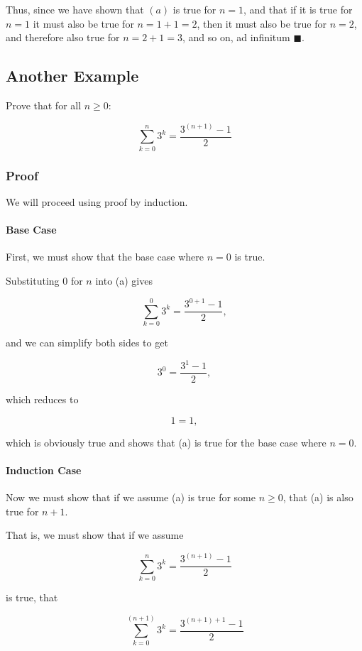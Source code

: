 \documentclass{article}
\begin{document}
Thus, since we have shown that $(a)$ is true for $n = 1$,
and that if it is true for $n = 1$ it must also be true for $n = 1 + 1 = 2$, then it must also be true for
$n = 2$, and therefore also true for $n = 2 + 1 = 3$, and so on, ad infinitum $\blacksquare$.

\subsection{Another Example}

Prove that for all $n \geq 0$:

\[ \tag{a} \sum_{k=0}^n 3^k = \frac{3^{(n+1)} - 1}{2} \]

\subsubsection{Proof}

We will proceed using proof by induction.

\paragraph{Base Case}

First, we must show that the base case where $n = 0$ is true.

Substituting $0$ for $n$ into (a) gives

\[ \tag{b} \sum_{k=0}^0 3^k = \frac{3^{0+1} - 1}{2}, \]

and we can simplify both sides to get

\[ \tag{c} 3^0 = \frac{3^1 - 1}{2}, \]

which reduces to

\[ \tag{d} 1 = 1, \]

which is obviously true and shows that (a) is true for the base case where $n = 0$.

\paragraph{Induction Case}

Now we must show that if we assume (a) is true for some $n \geq 0$, that (a) is also true for $n + 1$.

That is, we must show that if we assume

\[ \tag{e} \sum_{k=0}^n 3^k = \frac{3^{(n+1)} - 1}{2} \]

is true, that

\[ \tag{f} \sum_{k=0}^{(n+1)} 3^k = \frac{3^{(n+1)+1} - 1}{2} \]
\end{document}
